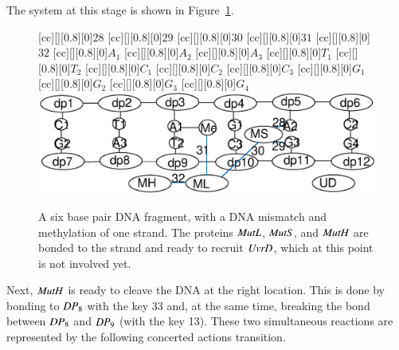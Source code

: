 The system at this stage is shown in Figure~\ref{fig:state15}. 
%
\begin{figure}[h!]
[cc][][0.8][0]{$28$}
[cc][][0.8][0]{$29$}
[cc][][0.8][0]{$30$}
[cc][][0.8][0]{$31$}
[cc][][0.8][0]{$32$}
[cc][][0.8][0]{$A_1$}
[cc][][0.8][0]{$A_2$}
[cc][][0.8][0]{$A_3$}
[cc][][0.8][0]{$T_1$}
[cc][][0.8][0]{$T_2$}
[cc][][0.8][0]{$C_1$}
[cc][][0.8][0]{$C_2$}
[cc][][0.8][0]{$C_3$}
[cc][][0.8][0]{$G_1$}
[cc][][0.8][0]{$G_2$}
[cc][][0.8][0]{$G_3$}
[cc][][0.8][0]{$G_4$}
  \centering
    \includegraphics[width=1.0\textwidth]{mmr/state15}
  \caption[A six base pair DNA fragment.]{A six base pair DNA fragment, with a DNA mismatch and methylation of one strand. The proteins $\mathit{MutL}$, $\mathit{MutS}$, and  $\mathit{MutH}$ are bonded to the strand and ready to recruit $\mathit{UvrD}$, which at this point is not
  involved yet.}
  \label{fig:state15}
\end{figure}

Next, $\mathit{MutH}$ is ready to cleave the DNA at the right location. This is done by bonding to $\mathit{DP}_8$ with the key 33 and, at the same time, breaking the bond between $\mathit{DP}_8$ and $\mathit{DP}_9$ (with the key 13). These two simultaneous reactions are represented by the following concerted actions transition.

